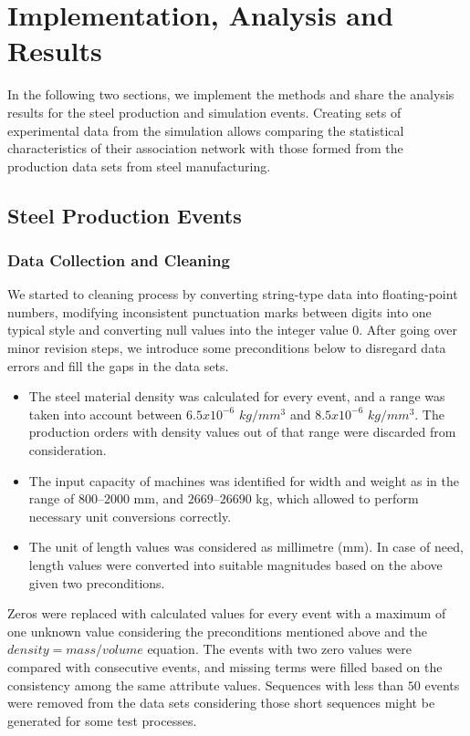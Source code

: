 \chapter{Implementation, Analysis and Results}\label{implementation_analysis}
In the following two sections, we implement the methods and share the analysis results for the steel production and simulation events. Creating sets of experimental data from the simulation allows comparing the statistical characteristics of their association network with those formed from the production data sets from steel manufacturing.
\section{Steel Production Events}
\subsection{Data Collection and Cleaning}\label{data_collection_cleaning}

We started to cleaning process by converting string-type data into floating-point numbers, modifying inconsistent punctuation marks between digits into one typical style and converting null values into the integer value $0$. After going over minor revision steps, we introduce some preconditions below to disregard data errors and fill the gaps in the data sets.
\begin{itemize}
	\item The steel material density was calculated for every event, and a range was taken into account between $6.5 x 10^{-6}$ $kg/mm^{3}$ and $8.5 x 10^{-6}$ $kg/mm^{3}$. The production orders with density values out of that range were discarded from consideration.
	\item The input capacity of machines was identified for width and weight as in the range of $800$--$2000$ mm, and $2669$--$26690$ kg, which allowed to perform necessary unit conversions correctly.
	\item The unit of length values was considered as millimetre (mm). In case of need, length values were converted into suitable magnitudes based on the above given two preconditions.
\end{itemize}
Zeros were replaced with calculated values for every event with a maximum of one unknown value considering the preconditions mentioned above and the $density = mass/volume$ equation. The events with two zero values were compared with consecutive events, and missing terms were filled based on the consistency among the same attribute values. Sequences with less than $50$ events were removed from the data sets considering those short sequences might be generated for some test processes.

